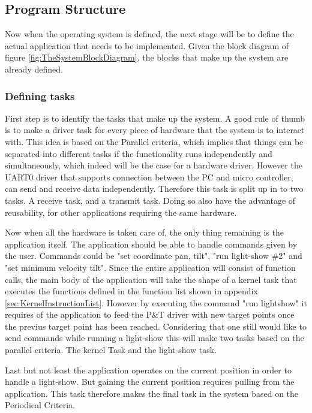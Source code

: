 \subsection{Program Structure}
\label{sec:ProgramStructure}

Now when the operating system is defined, the next stage will be to define the actual application that needs to be implemented. Given the block diagram of figure \ref{fig:TheSystemBlockDiagram}, the blocks that make up the system are already defined.

\subsubsection{Defining tasks}
\label{sec:DefiningTasks}
First step is to identify the tasks that make up the system. A good rule of thumb is to make a driver task for every piece of hardware that the system is to interact with. This idea is based on the Parallel criteria, which implies that things can be separated into different tasks if the functionality runs independently and simultaneously, which indeed will be the case for a hardware driver.
However the UART0 driver that supports connection between the PC and micro controller, can send and receive data independently. Therefore this task is split up in to two tasks. A receive task, and a transmit task.
Doing so also have the advantage of reusability, for other applications requiring the same hardware. 

Now when all the hardware is taken care of, the only thing remaining is the application itself. The application should be able to handle commands given by the user. Commands could be "set coordinate pan, tilt", "run light-show \#2" and "set minimum velocity tilt". Since the entire application will consist of function calls, the main body of the application will take the shape of a kernel task that executes the functions defined in the function list shown in appendix 
\ref{sec:KernelInstructionList}. However by executing the command "run lightshow" it requires of the application to feed the P\&T driver with new target points once the previus target point has been reached. Considering that one still would like to send commands while running a light-show this will make two tasks based on the parallel criteria. The kernel Task and the light-show task.

Last but not least the application operates on the current position in order to handle a light-show. But gaining the current position requires pulling from the application. This task therefore makes the final task in the system based on the Periodical Criteria. 

